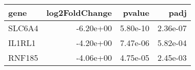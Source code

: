 \begin{tabular}{lrrr}
\toprule
  gene &  log2FoldChange &   pvalue &     padj \\
\midrule
SLC6A4 &       -6.20e+00 & 5.80e-10 & 2.36e-07 \\
IL1RL1 &       -4.20e+00 & 7.47e-06 & 5.82e-04 \\
RNF185 &       -4.06e+00 & 4.75e-05 & 2.45e-03 \\
\bottomrule
\end{tabular}
